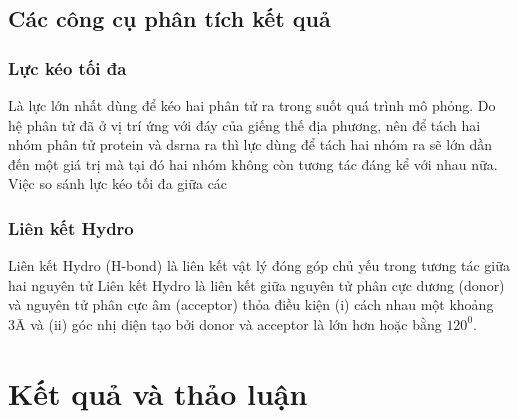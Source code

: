 \documentclass[12pt,a4paper,reqno, oneside]{book}
\begin{document}
\section{Các công cụ phân tích kết quả}
	\subsection{Lực kéo tối đa}
	\hspace{18pt}
	Là lực lớn nhất dùng để kéo hai phân tử ra trong suốt quá trình mô phỏng. Do hệ phân tử đã ở vị trí ứng với đáy của giếng thế địa phương, nên để tách hai nhóm phân tử protein và \gls{dsrna} ra thì lực dùng để tách hai nhóm ra sẽ lớn dần đến một giá trị mà tại đó hai nhóm không còn tương tác đáng kể với nhau nữa.
	Việc so sánh lực kéo tối đa giữa các
	\subsection{Liên kết Hydro}
	\hspace{18pt}
	Liên kết Hydro (H-bond) là liên kết vật lý đóng góp chủ yếu trong tương tác giữa hai nguyên tử\cite{}
	Liên kết Hydro là liên kết giữa nguyên tử phân cực dương (donor) và nguyên tử phân cực âm (acceptor) thỏa điều kiện (i) cách nhau một khoảng 3\={A} và (ii) góc nhị diện tạo bởi donor và acceptor là lớn hơn hoặc bằng $120^{0}$.




\newpage
\pagestyle{fancy}
\setcounter{chapter}{2}
\chapter{Kết quả và thảo luận}
\end{document}
